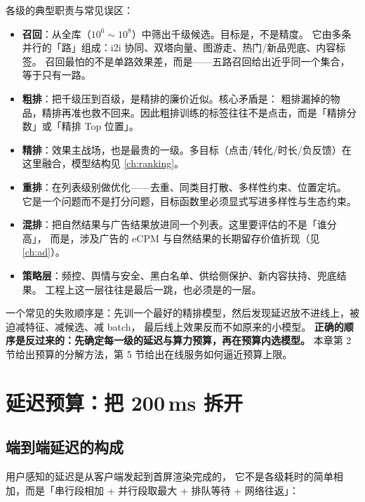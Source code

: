 各级的典型职责与常见误区：

\begin{itemize}
  \item \textbf{召回}：从全库（$10^{6} \sim 10^{8}$）中筛出千级候选。目标是，不是精度。
        它由多条并行的「路」组成：i2i 协同、双塔向量、图游走、热门/新品兜底、内容标签。
        召回最怕的不是单路效果差，而是——五路召回给出近乎同一个集合，等于只有一路。
  \item \textbf{粗排}：把千级压到百级，是精排的廉价近似。核心矛盾是：
        粗排漏掉的物品，精排再准也救不回来。因此粗排训练的标签往往不是点击，而是「精排分数」或「精排 Top 位置」。
  \item \textbf{精排}：效果主战场，也是最贵的一级。多目标（点击/转化/时长/负反馈）在这里融合，模型结构见 \cref{ch:ranking}。
  \item \textbf{重排}：在列表级别做优化——去重、同类目打散、多样性约束、位置定坑。
        它是一个问题而不是打分问题，目标函数里必须显式写进多样性与生态约束。
  \item \textbf{混排}：把自然结果与广告结果放进同一个列表。这里要评估的不是「谁分高」，
        而是，涉及广告的 eCPM 与自然结果的长期留存价值折现（见 \cref{ch:ad}）。
  \item \textbf{策略层}：频控、舆情与安全、黑白名单、供给侧保护、新内容扶持、兜底结果。
        工程上这一层往往是最后一跳，也必须是的一层。
\end{itemize}

\begin{keypoint}
一个常见的失败顺序是：先训一个最好的精排模型，然后发现延迟放不进线上，被迫减特征、减候选、减 batch，
最后线上效果反而不如原来的小模型。
\textbf{正确的顺序是反过来的：先确定每一级的延迟与算力预算，再在预算内选模型。}
本章第 2 节给出预算的分解方法，第 5 节给出在线服务如何逼近预算上限。
\end{keypoint}

\section{延迟预算：把 200\,ms 拆开}

\subsection{端到端延迟的构成}

用户感知的延迟是从客户端发起到首屏渲染完成的，
它不是各级耗时的简单相加，而是「串行段相加 + 并行段取最大 + 排队等待 + 网络往返」：

